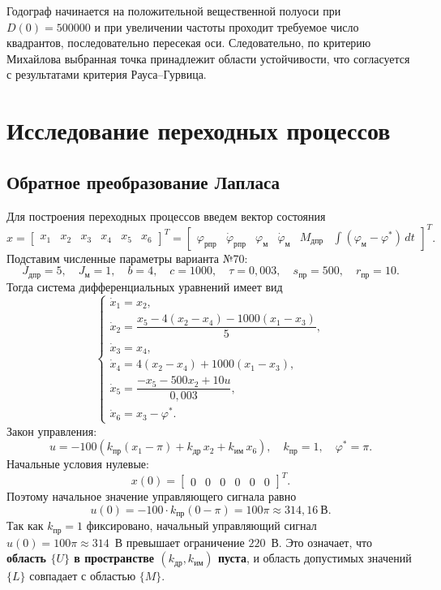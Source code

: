 \documentclass[a4paper, 14pt]{extarticle}
\begin{document}
Годограф начинается на положительной вещественной полуоси при $D(0)=500000$ и при увеличении частоты проходит требуемое число квадрантов, последовательно пересекая оси. Следовательно, по критерию Михайлова выбранная точка принадлежит области устойчивости, что согласуется с результатами критерия Рауса--Гурвица.

\newpage

\section{Исследование переходных процессов}

\subsection{Обратное преобразование Лапласа}

Для построения переходных процессов введем вектор состояния
\[
	x=
	\begin{bmatrix}
		x_1 & x_2 & x_3 & x_4 & x_5 & x_6
	\end{bmatrix}^{T}
	=
	\begin{bmatrix}
		\varphi_{\text{рпр}}     &
		\dot\varphi_{\text{рпр}} &
		\varphi_\text{м}         &
		\dot\varphi_\text{м}     &
		M_{\text{дпр}}           &
		\int(\varphi_\text{м}-\varphi^*)\,dt
	\end{bmatrix}^{T}.
\]
Подставим численные параметры варианта №70:
\[
	J_{\text{дпр}}=5,\quad J_\text{м}=1,\quad b=4,\quad c=1000,
	\quad \tau=0{,}003,\quad s_{\text{пр}}=500,\quad r_{\text{пр}}=10.
\]
Тогда система дифференциальных уравнений имеет вид
\[
	\begin{cases}
		\dot x_1=x_2,                                     \\[4pt]
		\dot x_2=\dfrac{x_5-4(x_2-x_4)-1000(x_1-x_3)}{5}, \\[8pt]
		\dot x_3=x_4,                                     \\[4pt]
		\dot x_4=4(x_2-x_4)+1000(x_1-x_3),                \\[4pt]
		\dot x_5=\dfrac{-x_5-500x_2+10u}{0{,}003},         \\[4pt]
		\dot x_6=x_3-\varphi^*.
	\end{cases}
\]
Закон управления:
\[
	u=-100\left(k_\text{пр}(x_1-\pi)+k_\text{др}\,x_2+k_\text{им}\,x_6\right),
	\quad k_\text{пр}=1,\quad\varphi^*=\pi.
\]
Начальные условия нулевые:
\[
	x(0)=
	\begin{bmatrix}
		0 & 0 & 0 & 0 & 0 & 0
	\end{bmatrix}^{T}.
\]
Поэтому начальное значение управляющего сигнала равно
\[
	u(0)=-100\cdot k_\text{пр}(0-\pi)=100\pi\approx314{,}16~\text{В}.
\]
Так как $k_\text{пр}=1$ фиксировано, начальный управляющий сигнал $u(0)=100\pi\approx314$~В превышает ограничение $220$~В. Это означает, что\textbf{ область $\{U\}$ в пространстве $(k_\text{др},k_\text{им})$ пуста}, и область допустимых значений $\{L\}$ совпадает с областью $\{M\}$.
\end{document}
